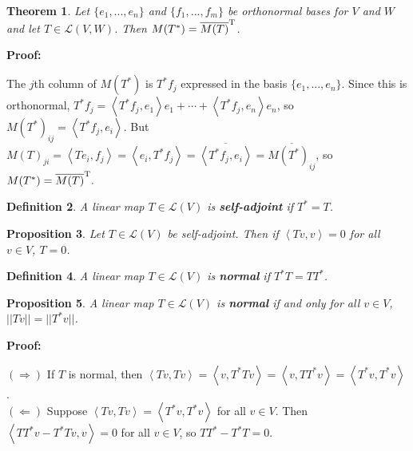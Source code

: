 \documentclass{article}
\theoremstyle{colontheorem}
\newtheorem{theorem}{Theorem}[section]
\newtheorem{proposition}[theorem]{Proposition}
\newtheorem{definition}[theorem]{Definition}
\newenvironment{Theorem}
{
	\begin{mdframed}[backgroundcolor=TheoremOrange!10]
	\begin{theorem}
}
{
	\end{theorem}
	\end{mdframed}
	
	\vspace{.15in}
}
\newenvironment{Proposition}
{
	\begin{mdframed}[backgroundcolor=TheoremOrange!10]
	\begin{proposition}
}
{
	\end{proposition}
	\end{mdframed}
	
	\vspace{.15in}
}
\newenvironment{Def}
{
	\begin{mdframed}[backgroundcolor=DefGreen!10]
	\begin{definition}
}
{
	\end{definition}
	\end{mdframed}
	
	\vspace{.15in}
}
\newenvironment{Proof}
{
	\vspace{-.3in}
	
	\begin{mdframed}[backgroundcolor=ProofPurple!10]
	\textbf{Proof:}%
}
{
	\end{mdframed}
	
	\vspace{.15in}
}
\begin{document}
\begin{Theorem}
	
	Let $\{e_1, ..., e_n\}$ and $\{f_1, ..., f_m\}$ be orthonormal bases for $V$ and $W$ and let $T \in \mathcal{L}(V, W)$. Then $M(T^*) = \overline{M(T)}^\textnormal{T}$.
	
\end{Theorem}



\begin{Proof}
	The $j$th column of $M(T^*)$ is $T^* f_j$ expressed in the basis $\{e_1, ..., e_n\}$. Since this is orthonormal, $T^* f_j = \left< T^* f_j, e_1 \right> e_1 + \cdots + \left< T^* f_j, e_n \right> e_n$, so $M(T^*)_{ij} = \left< T^* f_j, e_i \right>$. But $M(T)_{ji} = \left< Te_i, f_j \right> = \left< e_i, T^* f_j \right> = \overline{\left< T^* f_j, e_i \right>} = \overline{M(T^*)_{ij}}$, so $M(T^*) = \overline{M(T)}^\textnormal{T}.$
	
\end{Proof}



\begin{Def}
	
	A linear map $T \in \mathcal{L}(V)$ is \textbf{self-adjoint} if $T^* = T$.
	
\end{Def}



\begin{Proposition}
	
	Let $T \in \mathcal{L}(V)$ be self-adjoint. Then if $\left< Tv, v \right> = 0$ for all $v \in V$, $T = 0$.
	
\end{Proposition}



\begin{Def}
	
	A linear map $T \in \mathcal{L}(V)$ is \textbf{normal} if $T^* T = TT^*$.
	
\end{Def}



\begin{Proposition}
	
	A linear map $T \in \mathcal{L}(V)$ is \textbf{normal} if and only for all $v \in V$, $||Tv|| = ||T^* v||$.
	
\end{Proposition}



\begin{Proof}
	$(\Rightarrow)$ If $T$ is normal, then $\left< Tv, Tv \right> = \left< v, T^* T v \right> = \left< v, T T^* v \right> = \left< T^* v, T^* v \right>$.\\
	
	$(\Leftarrow)$ Suppose $\left< Tv, Tv \right> = \left< T^* v, T^* v \right>$ for all $v \in V$. Then $\left< TT^* v - T^* T v, v \right> = 0$ for all $v \in V$, so $TT^* - T^* T = 0$.
	
\end{Proof}
\end{document}

